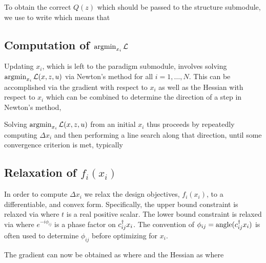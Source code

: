 To obtain the correct $Q(z)$ which should be passed to the structure submodule,
    we use  to write
    which means that

\subsection{Computation of $\mathop{\rm argmin}_{x_i} \mathcal{L}$}
Updating $x_i$, which is left to the paradigm submodule,
    involves solving $\mathop{\rm argmin}_{x_i} \mathcal{L}(x, z, u)$ via Newton's method for all $i = 1, \ldots, N$.
This can be accomplished via the gradient with respect to $x_i$
    as well as the Hessian with respect to $x_i$
    which can be combined to determine the direction of a step in Newton's method,

Solving $\mathop{\rm argmin}_{x_i} \mathcal{L}(x, z, u)$ from an initial $x_i$ thus proceeds by
    repeatedly computing $\Delta x_i$ and then performing a line search along that direction,
    until some convergence criterion is met, typically

\subsection{Relaxation of $f_i(x_i)$}
In order to compute $\Delta x_i$ we relax the design objectives, $f_i(x_i)$, to a differentiable, and convex form.
Specifically, the upper bound constraint is relaxed via
    where $t$ is a real positive scalar. The lower bound constraint is relaxed via
     where $e^{-i\phi_{ij}}$ is a phase factor on $c^\dagger_{ij} x_i$.
The convention of $\phi_{ij} = \text{angle}(c^\dagger_{ij} x_i)$ is often used
    to determine $\phi_{ij}$ before optimizing for $x_i$.

The gradient can now be obtained as
    where
    and the Hessian as 
    where



